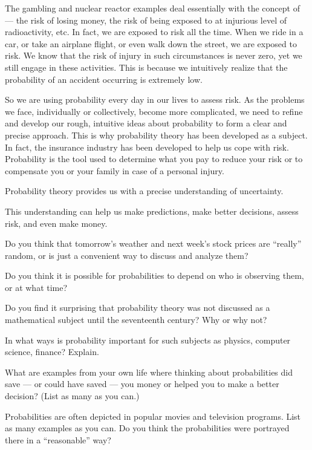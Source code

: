 The gambling and nuclear reactor examples deal essentially with the concept of  --- the risk of losing
money, the risk of being exposed to at injurious level of  radioactivity, etc. In fact, we are exposed to risk all the
 time. When we ride in a car, or take an airplane flight, or even walk down the street, we are exposed to risk. We
 know that the risk of injury in such circumstances is never zero, yet we still engage in these activities. This is
 because we intuitively realize that the probability of an accident occurring is extremely low.

 So we are using probability every day in our lives to assess risk. As the problems we face, individually or
 collectively, become more complicated, we need to refine and develop our rough, intuitive ideas about probability to
 form a clear and precise approach. This is why probability theory has been developed as a subject. In fact, the
 insurance industry has been developed to help us cope with risk. Probability is the tool used to determine what you
 pay to reduce your risk or to compensate you or your family in case of a personal injury.

\begin{summary}
    \item Probability theory provides us with a precise understanding of uncertainty.
    \item This understanding can help us make predictions, make better decisions, assess risk, and even make money.
\end{summary}

\begin{discussion}
    \item Do you think that tomorrow's weather and next week's stock prices are ``really'' random, or is just a
    convenient way to discuss and analyze them?
    \item Do you think it is possible for probabilities to depend on who is observing them, or at what time?
    \item Do you find it surprising that probability theory was not discussed as a mathematical subject until the
    seventeenth century? Why or why not?
    \item In what ways is probability important for such subjects as physics, computer science, finance? Explain.
    \item What are examples from your own life where thinking about probabilities did save --- or could have saved
    --- you money or helped you to make a better decision? (List as many as you can.)
    \item Probabilities are often depicted in popular movies and television programs. List as many examples as you
    can. Do you think the probabilities were portrayed there in a ``reasonable'' way?
\end{discussion}